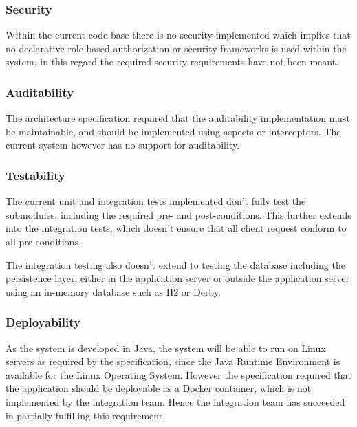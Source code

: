\documentclass[a4paper,10pt]{article}
\begin{document}
\subsubsection{Security}
Within the current code base there is no security implemented which implies that no declarative role based authorization or security frameworks is used within the system, in this regard the required security requirements have not been meant.

\subsubsection{Auditability}
The architecture specification required that the auditability implementation must be maintainable, and should be implemented using aspects or interceptors. The current system however has no support for auditability.

\subsubsection{Testability}
The current unit and integration tests implemented don't fully test the submodules, including the required pre- and post-conditions.  This further extends into the integration tests, which doesn't ensure that all client request conform to all pre-conditions.

The integration testing also doesn't extend to testing the database including the persistence layer, either in the application server or outside the application server using an in-memory database such as H2 or Derby.

\subsubsection{Deployability}
As the system is developed in Java, the system will be able to run on Linux servers as required by the specification, since the Java Runtime Environment is available for the Linux Operating System.  However the specification required that the application should be deployable as a Docker container,
which is not implemented by the integration team.  Hence the integration team has succeeded in partially fulfilling this requirement.
\end{document}
